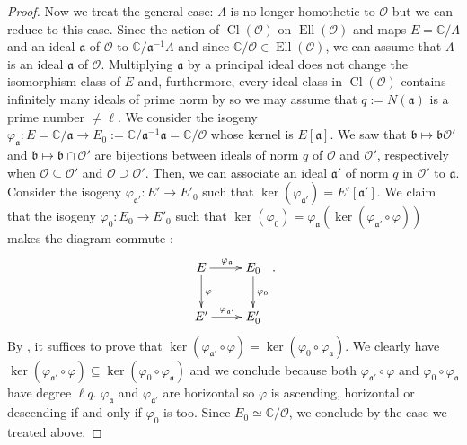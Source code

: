 \documentclass[a4paper,10pt]{report}
\theoremstyle{definition}
\theoremstyle{plain}
\theoremstyle{definition}
\newcommand{\C}{\mathbb{C}}
\newcommand{\mO}{\mathcal{O}}
\renewcommand{\(}{\left(}
\renewcommand{\)}{\right)}
\newcommand{\mf}[1]{\mathfrak{#1}}
\DeclareMathOperator{\Cl}{Cl}
\DeclareMathOperator{\Ell}{Ell}
\begin{document}
\begin{proof}
Now we treat the general case: $\Lambda$ is no longer homothetic to $\mO$ but we can reduce to this case. Since the action of $\Cl(\mO)$ on $\Ell(\mO)$ and maps $E=\C/\Lambda$ and an ideal $\mf{a}$ of $\mO$ to $\C/\mf{a}^{-1}\Lambda$ and since $\C/\mO\in\Ell(\mO)$, we can assume that $\Lambda$ is an ideal $\mf{a}$ of $\mO$.  Multiplying $\mf{a}$ by a principal ideal does not change the isomorphism class of $E$ and, furthermore, every ideal class in $\Cl(\mO)$ contains infinitely many ideals of prime norm by \cite[Theorems 7.7. (iii) and 9.12]{Cox} so we may assume that $q:=N(\mf{a})$ is a prime number $\neq\ell$.  We consider the isogeny $\varphi_{\mf{a}}:E=\C/\mf{a}\longrightarrow E_0:=\C/\mf{a}^{-1}\mf{a}=\C/\mO$ whose kernel is $E[\mf{a}]$. We saw that $\mf{b}\longmapsto\mf{b}\mO'$ and $\mf{b}\longmapsto\mf{b}\cap\mO'$ are bijections between ideals of norm $q$ of $\mO$ and $\mO'$, respectively when $\mO\subseteq\mO'$ and $\mO\supseteq\mO'$.  Then, we can associate an ideal $\mf{a}'$ of norm $q$ in $\mO'$ to $\mf{a}$. Consider the isogeny $\varphi_{\mf{a}'}:E'\longrightarrow E'_0$ such that $\ker(\varphi_{\mf{a}'})=E'[\mf{a}']$. We claim that the isogeny $\varphi_0 : E_0\longrightarrow E'_0$ such that $\ker(\varphi_0)=\varphi_{\mf{a}}(\ker(\varphi_{\mf{a}'}\circ\varphi))$ makes the diagram commute :
\[\xymatrix{
E \ar[d]^{\varphi} \ar[r]^{\varphi_{\mf{a}}} & E_0 \ar[d]^{\varphi_0} \\
E' \ar[r]^{\varphi_{\mf{a}'}} & E'_0
}.\]
By \cite[Corollary III.4.11]{Silverman1}, it suffices to prove that $\ker(\varphi_{\mf{a}'}\circ\varphi)=\ker(\varphi_0\circ \varphi_{\mf{a}})$. We clearly have $\ker(\varphi_{\mf{a}'}\circ\varphi)\subseteq \ker(\varphi_0\circ \varphi_{\mf{a}})$ and we conclude because both $\varphi_{\mf{a}'}\circ\varphi$ and $\varphi_0\circ \varphi_{\mf{a}}$ have degree $\ell q$.  $\varphi_{\mf{a}}$ and $\varphi_{\mf{a}'}$ are horizontal so $\varphi$ is ascending, horizontal or descending if and only if $\varphi_0$ is too. Since $E_0\simeq\C/\mO$, we conclude by the case we treated above.


\end{proof}
\end{document}
